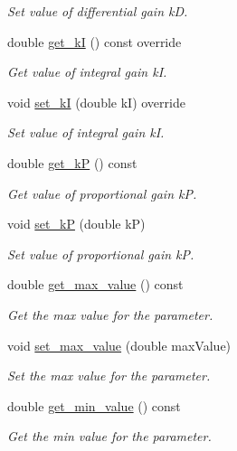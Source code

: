 \begin{DoxyCompactItemize}
\begin{DoxyCompactList}\small\item\em Set value of differential gain kD. \end{DoxyCompactList}\item 
double \hyperlink{classPIDController_af79b88e9f6c99667fb1474219f00f6f3}{get\+\_\+kI} () const override
\begin{DoxyCompactList}\small\item\em Get value of integral gain kI. \end{DoxyCompactList}\item 
void \hyperlink{classPIDController_a5724db51f8d64e8adf5c6f466dc66d8c}{set\+\_\+kI} (double kI) override
\begin{DoxyCompactList}\small\item\em Set value of integral gain kI. \end{DoxyCompactList}\item 
double \hyperlink{classPIDController_ac838d1c775ff75c7845602b189e5f214}{get\+\_\+kP} () const
\begin{DoxyCompactList}\small\item\em Get value of proportional gain kP. \end{DoxyCompactList}\item 
void \hyperlink{classPIDController_a7b97f2fa293347e9e9391d5ca3b80e8b}{set\+\_\+kP} (double kP)
\begin{DoxyCompactList}\small\item\em Set value of proportional gain kP. \end{DoxyCompactList}\item 
double \hyperlink{classPIDController_ad4420e831743f6b66303f6a24bf7fbdc}{get\+\_\+max\+\_\+value} () const
\begin{DoxyCompactList}\small\item\em Get the max value for the parameter. \end{DoxyCompactList}\item 
void \hyperlink{classPIDController_a942161494e6b3bc4996e688f390a59bf}{set\+\_\+max\+\_\+value} (double max\+Value)
\begin{DoxyCompactList}\small\item\em Set the max value for the parameter. \end{DoxyCompactList}\item 
double \hyperlink{classPIDController_ab29545c6bcce3ef804bdbf0f2441cb4e}{get\+\_\+min\+\_\+value} () const
\begin{DoxyCompactList}\small\item\em Get the min value for the parameter. \end{DoxyCompactList}\item 

\end{DoxyCompactItemize}

